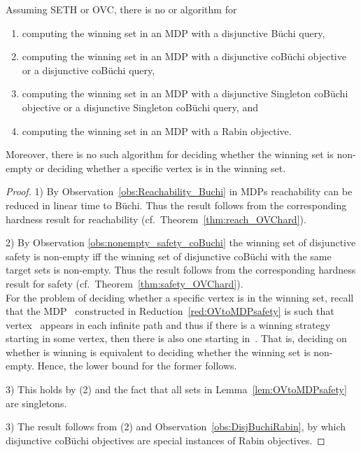 \documentclass[11pt,letterpaper]{article}
\begin{document}
\begin{proposition}
  Assuming SETH or OVC, there is no  or  algorithm for
  \begin{enumerate}
   \item computing the winning set in an MDP with a disjunctive Büchi query,
   \item computing the winning set in an MDP with a disjunctive coBüchi objective or 
						 a disjunctive coBüchi query,
   \item computing the winning set in an MDP with a disjunctive Singleton coBüchi objective or
   						 a disjunctive Singleton coBüchi query, and
   \item computing the winning set in an MDP with a Rabin objective.
  \end{enumerate}  
  Moreover, there is no such algorithm for deciding whether the winning set is non-empty
  or deciding whether a specific vertex is in the winning set. 
\end{proposition}
\begin{proof}
 1) By Observation~\ref{obs:Reachability_Buchi} in MDPs reachability can be reduced in
 linear time to Büchi. Thus the result follows from
    the corresponding hardness result for reachability (cf.\ Theorem~\ref{thm:reach_OVChard}).
    
 2) By Observation \ref{obs:nonempty_safety_coBuchi} the winning set of disjunctive safety is non-empty iff
    the winning set of disjunctive coBüchi with the same target sets is non-empty. Thus 
    the result follows from the corresponding hardness result for safety (cf.\  Theorem~\ref{thm:safety_OVChard}).\\
    For the problem of deciding whether a specific vertex is in the winning set, recall
    that the MDP~ constructed in Reduction~\ref{red:OVtoMDPsafety} is such that vertex~
    appears in each infinite path and thus if there is a winning strategy starting in some vertex,
    then there is also one starting in~. 
    That is, deciding on  whether  is winning is equivalent to deciding 
    whether the winning
    set is non-empty. Hence, the lower bound for the former follows.  
 
 3) This holds by (2) and the fact that all sets  in Lemma~\ref{lem:OVtoMDPsafety} are singletons.
 
 3) The result follows from (2) and Observation~\ref{obs:DisjBuchiRabin}, by which disjunctive coBüchi objectives are special instances of Rabin objectives.
\end{proof}
\end{document}
